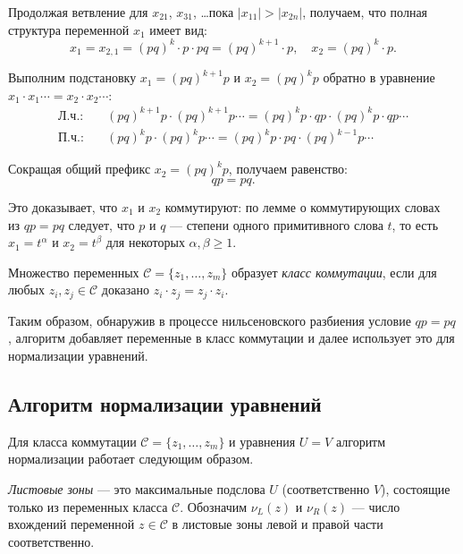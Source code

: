 \documentclass[14pt, russian]{scrartcl}
\begin{document}
Продолжая ветвление для $x_{21}$, $x_{31}$, \ldots пока $|x_{11}| > |x_{2n}|$,
получаем, что полная структура переменной $x_1$ имеет вид:
\[
x_1 = x_{2,1} = (pq)^k \cdot p \cdot pq = (pq)^{k+1} \cdot p,
\quad x_2 = (pq)^k \cdot p.
\]

Выполним подстановку $x_1 = (pq)^{k+1} p$ и $x_2 = (pq)^k p$ обратно в уравнение
$x_1 \cdot x_1 \cdots = x_2 \cdot x_2 \cdots$:
\begin{align*}
\text{Л.ч.:}\quad & (pq)^{k+1}p \cdot (pq)^{k+1}p \cdots
  = (pq)^k p \cdot qp \cdot (pq)^k p \cdot qp \cdots \\
\text{П.ч.:}\quad & (pq)^k p \cdot (pq)^k p \cdots
  = (pq)^k p \cdot pq \cdot (pq)^{k-1} p \cdots
\end{align*}

Сокращая общий префикс $x_2 = (pq)^k p$, получаем равенство:
\[
qp = pq.
\]

Это доказывает, что $x_1$ и $x_2$ коммутируют: по лемме о коммутирующих
словах~\cite{hmelevskii1971} из $qp = pq$ следует, что $p$ и $q$ --- степени
одного примитивного слова $t$, то есть $x_1 = t^\alpha$ и $x_2 = t^\beta$ для
некоторых $\alpha, \beta \geq 1$.

\begin{Definition}
Множество переменных $\mathcal{C} = \{z_1, \ldots, z_m\}$ образует
\emph{класс коммутации}, если для любых $z_i, z_j \in \mathcal{C}$ доказано
$z_i \cdot z_j = z_j \cdot z_i$.
\end{Definition}

Таким образом, обнаружив в процессе нильсеновского разбиения условие $qp = pq$,
алгоритм добавляет переменные в класс коммутации и далее использует это для
нормализации уравнений.

\subsection{Алгоритм нормализации уравнений}

Для класса коммутации $\mathcal{C} = \{z_1, \ldots, z_m\}$ и уравнения $U = V$
алгоритм нормализации работает следующим образом.

\emph{Листовые зоны} --- это максимальные подслова $U$ (соответственно $V$),
состоящие только из переменных класса $\mathcal{C}$. Обозначим $\nu_L(z)$ и
$\nu_R(z)$ --- число вхождений переменной $z \in \mathcal{C}$ в листовые зоны
левой и правой части соответственно.
\end{document}
